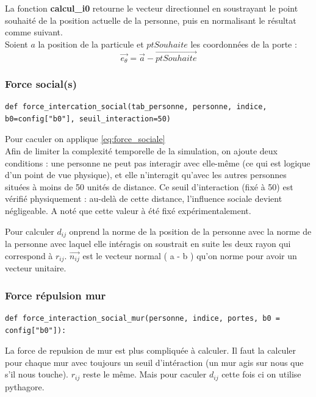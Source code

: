 \documentclass[a4paper,12pt]{article}
\begin{document}
La fonction \textbf{calcul\_i0} retourne le vecteur directionnel en soustrayant le point souhaité de la position actuelle de la personne, puis en normalisant le résultat comme suivant.
\\
\indent Soient $a$ la position de la particule et $ptSouhaite$ les coordonnées de la porte :
\begin{equation}
	\vec{e_\theta} = \vec{a} - \vec{ptSouhaite}
\end{equation}


\subsubsection{Force social(s)}


\begin{verbatim}
def force_intercation_social(tab_personne, personne, indice, b0=config["b0"], seuil_interaction=50)
\end{verbatim}

Pour caculer on applique \eqref{eq:force_sociale}
\\

Afin de limiter la complexité temporelle de la simulation, on ajoute deux conditions : une personne ne peut pas interagir avec elle-même (ce qui est logique d’un point de vue physique), et elle n’interagit qu’avec les autres personnes situées à moins de 50 unités de distance.  Ce seuil d’interaction (fixé à 50) est vérifié physiquement : au-delà de cette distance, l’influence sociale devient négligeable. A noté que cette valeur à été fixé expérimentalement.


Pour calculer $d_{ij}$ onprend la norme de la position de la personne avec la norme de la personne avec laquel elle intéragis on soustrait en suite les deux rayon qui correspond à $r_{ij}$. $\vec{n_{ij}}$ est le vecteur normal ( a - b ) qu'on norme pour avoir un vecteur unitaire. 


\subsubsection{Force répulsion mur}

\begin{verbatim}
def force_interaction_social_mur(personne, indice, portes, b0 = config["b0"]):
\end{verbatim}

La force de repulsion de mur est plus compliquée à calculer. Il faut la calculer pour chaque mur avec toujours un seuil d'intéraction (un mur agis sur nous que s'il nous touche). \textbf{$r_{ij}$} reste le même. Mais pour caculer \textbf{$d_{ij}$} cette fois ci on utilise pythagore.
\end{document}
